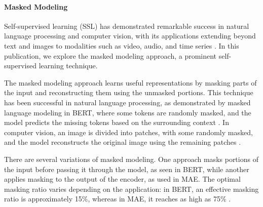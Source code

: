 \documentclass[12pt]{article} %
\newcommand{\para}[1]{\vspace*{-4.5mm}\paragraph{#1}}
\begin{document}


\para{Masked Modeling}
Self-supervised learning (SSL) has demonstrated remarkable success in natural language processing and computer vision, with its applications extending beyond text and images to modalities such as video, audio, and time series \citep{balestriero2023cookbook}. In this publication, we explore the masked modeling approach, a prominent self-supervised learning technique.

The masked modeling approach learns useful representations by masking parts of the input and reconstructing them using the unmasked portions. This technique has been successful in natural language processing, as demonstrated by masked language modeling in BERT, where some tokens are randomly masked, and the model predicts the missing tokens based on the surrounding context \citep{devlin2019bert}. In computer vision, an image is divided into patches, with some randomly masked, and the model reconstructs the original image using the remaining patches \citep{he2022masked}.

There are several variations of masked modeling. One approach masks portions of the input before passing it through the model, as seen in BERT, while another applies masking to the output of the encoder, as used in MAE. The optimal masking ratio varies depending on the application: in BERT, an effective masking ratio is approximately 15\%, whereas in MAE, it reaches as high as 75\% \citep{yao2022masked}.
\end{document}

